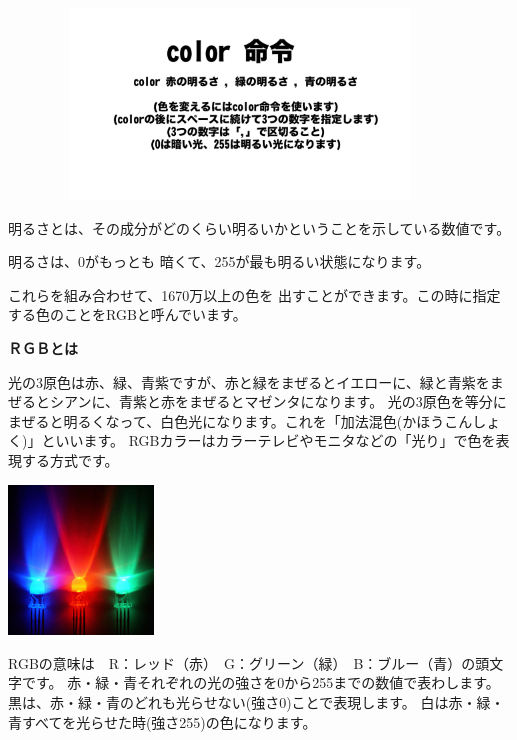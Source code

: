 \documentclass[a4paper,12pt]{jarticle}
\begin{document}
\bigskip
\bigskip

\begin{minipage}{9.781cm}
\centering
{\upshape
\includegraphics[keepaspectratio,width=12.277cm,height=5.08cm]{text02-img/text02-img030.png}}
\end{minipage}

\bigskip
\bigskip
\bigskip

明るさとは、その成分がどのくらい明るいかということを示している数値です。

明るさは、0がもっとも
暗くて、255が最も明るい状態になります。

これらを組み合わせて、1670万以上の色を
出すことができます。この時に指定する色のことをRGBと呼んでいます。

\bigskip
\bigskip

{\bfseries
ＲＧＢとは}

光の3原色は赤、緑、青紫ですが、赤と緑をまぜるとイエローに、緑と青紫をまぜるとシアンに、青紫と赤をまぜるとマゼンタになります。
光の3原色を等分にまぜると明るくなって、白色光になります。これを「加法混色(かほうこんしょく)」といいます。
RGBカラーはカラーテレビやモニタなどの「光り」で色を表現する方式です。

\bigskip
\bigskip

\begin{minipage}{9.781cm}
\centering
{\upshape
\includegraphics[keepaspectratio,width=3.854cm,height=3.988cm]{text02-img/text02-img033.jpg}}
\end{minipage}

\bigskip
\bigskip
\bigskip

RGBの意味は　R：レッド（赤）　G：グリーン（緑）　B：ブルー（青）の頭文字です。
赤・緑・青それぞれの光の強さを0から255までの数値で表わします。
黒は、赤・緑・青のどれも光らせない(強さ0)ことで表現します。
白は赤・緑・青すべてを光らせた時(強さ255)の色になります。
\end{document}
